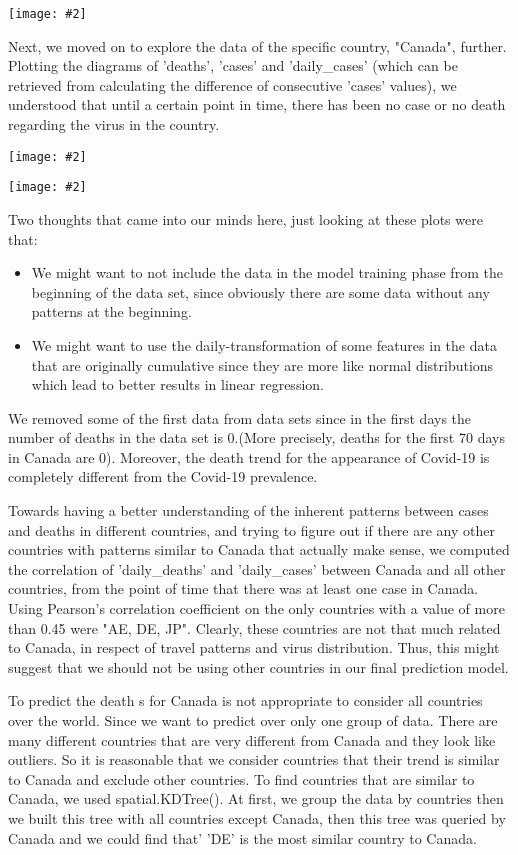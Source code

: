 \documentclass{article}
\newcommand{\centerfig}[2]{\begin{center}\texttt{[image: \#2]}\end{center}}
\begin{document}
\centerfig{.6}{./Images/2}

Next, we moved on to explore the data of the specific country, "Canada", further. Plotting the diagrams of 'deaths', 'cases' and 'daily\_cases' (which can be retrieved from calculating the difference of consecutive 'cases' values), we understood that until a certain point in time, there has been no case or no death regarding the virus in the country. 


\centerfig{.50}{./Images/3}

\centerfig{.55}{./Images/4}

Two thoughts that came into our minds here, just looking at these plots were that:

\begin{itemize}
\item We might want to not include the data in the model training phase from the beginning of the data set, since obviously there are some data without any patterns at the beginning.

\item We might want to use the daily-transformation of some features in the data that are originally cumulative since they are more like normal distributions which lead to better results in linear regression.
\end{itemize}

We removed some of the first data from data sets since in the first days the number of deaths in the data set is 0.(More precisely, deaths for the first 70 days in Canada are 0). Moreover, the death trend for the appearance of Covid-19 is completely different from the Covid-19 prevalence.

Towards having a better understanding of the inherent patterns between cases and deaths in different countries, and trying to figure out if there are any other countries with patterns similar to Canada that actually make sense, we computed the correlation of 'daily\_deaths' and 'daily\_cases' between Canada and all other countries, from the point of time that there was at least one case in Canada. Using Pearson’s correlation coefficient on the only countries with a value of more than 0.45 were "AE, DE, JP". Clearly, these countries are not that much related to Canada, in respect of travel patterns and virus distribution. Thus, this might suggest that we should not be using other countries in our final prediction model.

To predict the death s for Canada is not appropriate to consider all countries over the world. Since we want to predict over only one group of data. There are many different countries that are very different from Canada and they look like outliers. So it is reasonable that we consider countries that their trend is similar to Canada and exclude other countries. To find countries that are similar to Canada, we used spatial.KDTree(). At first, we group the data by countries then we built this tree with all countries except Canada, then this tree was queried by Canada and we could find that' 'DE' is the most similar country to Canada.
\end{document}
